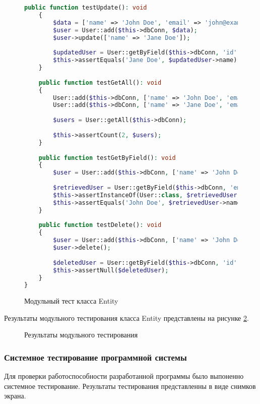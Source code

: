 \begin{figure}[H]
\begin{lstlisting}[language=PHP]
	public function testUpdate(): void
	{
		$data = ['name' => 'John Doe', 'email' => 'john@example.com'];
		$user = User::add($this->dbConn, $data);
		$user->update(['name' => 'Jane Doe']);
		
		$updatedUser = User::getByField($this->dbConn, 'id', $user->id);
		$this->assertEquals('Jane Doe', $updatedUser->name);
	}
	
	public function testGetAll(): void
	{
		User::add($this->dbConn, ['name' => 'John Doe', 'email' => 'john@example.com']);
		User::add($this->dbConn, ['name' => 'Jane Doe', 'email' => 'jane@example.com']);
		
		$users = User::getAll($this->dbConn);
		
		$this->assertCount(2, $users);
	}
	
	public function testGetByField(): void
	{
		$user = User::add($this->dbConn, ['name' => 'John Doe', 'email' => 'john@example.com']);
		
		$retrievedUser = User::getByField($this->dbConn, 'email', 'john@example.com');
		$this->assertInstanceOf(User::class, $retrievedUser);
		$this->assertEquals('John Doe', $retrievedUser->name);
	}
	
	public function testDelete(): void
	{
		$user = User::add($this->dbConn, ['name' => 'John Doe', 'email' => 'john@example.com']);
		$user->delete();
		
		$deletedUser = User::getByField($this->dbConn, 'id', $user->id);
		$this->assertNull($deletedUser);
	}
}
\end{lstlisting}  
\caption{Модульный тест класса Entity}
\label{unitEntity2:image}
\end{figure}

Результаты модульного тестирования класса Entity представлены на рисунке \ref{unit1:image}.

\begin{figure}[H]
	\caption{Результаты модульного тестирования}
	\label{unit1:image}
\end{figure}

\subsubsection{Системное тестирование программной системы}

Для проверки работоспособности разработанной программы было выпоненно системное тестирование. Результаты тестирования представленны в виде снимков экрана.

